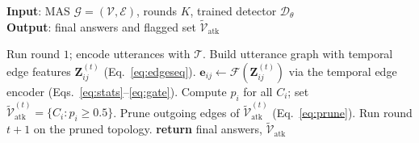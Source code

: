 \begin{algorithm}[tb]
\caption{Defended multi-agent dialogue with T-GAT}
\label{alg:main}
\textbf{Input}: MAS $\mathcal{G}=(\mathcal{V},\mathcal{E})$, rounds $K$, trained
detector $\mathcal{D}_\theta$\\
\textbf{Output}: final answers and flagged set $\tilde{\mathcal{V}}_{\text{atk}}$
\begin{algorithmic}[1]
\STATE Run round $1$; encode utterances with $\mathcal{T}$.
\STATE Build utterance graph with temporal edge features
$\mathbf{Z}_{ij}^{(t)}$ (Eq.~\ref{eq:edgeseq}).
\STATE $\mathbf{e}_{ij}\leftarrow\mathcal{F}(\mathbf{Z}_{ij}^{(t)})$ via the
temporal edge encoder (Eqs.~\ref{eq:stats}--\ref{eq:gate}).
\STATE Compute $p_i$ for all $C_i$; set
$\tilde{\mathcal{V}}_{\text{atk}}^{(t)}=\{C_i:p_i\ge0.5\}$.
\STATE Prune outgoing edges of $\tilde{\mathcal{V}}_{\text{atk}}^{(t)}$
(Eq.~\ref{eq:prune}).
\STATE Run round $t{+}1$ on the pruned topology.
\ENDFOR
\STATE \textbf{return} final answers, $\tilde{\mathcal{V}}_{\text{atk}}$
\end{algorithmic}
\end{algorithm}
